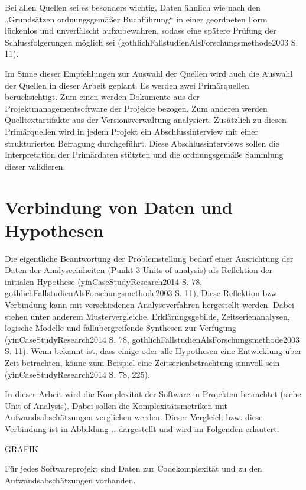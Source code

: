 Bei allen Quellen sei es besonders wichtig, Daten ähnlich wie nach den
„Grundsätzen ordnungsgemäßer Buchführung`` in einer geordneten Form
lückenlos und unverfälscht aufzubewahren, sodass eine spätere Prüfung
der Schlussfolgerungen möglich sei
(gothlichFallstudienAlsForschungsmethode2003 S. 11).

Im Sinne dieser Empfehlungen zur Auswahl der Quellen wird auch die
Auswahl der Quellen in dieser Arbeit geplant. Es werden zwei
Primärquellen berücksichtigt. Zum einen werden Dokumente aus der
Projektmanagementsoftware der Projekte bezogen. Zum anderen werden
Quelltextartifakte aus der Versionsverwaltung analysiert. Zusätzlich zu
diesen Primärquellen wird in jedem Projekt ein Abschlussinterview mit
einer strukturierten Befragung durchgeführt. Diese Abschlussinterviews
sollen die Interpretation der Primärdaten stützten und die
ordnungsgemäße Sammlung dieser validieren.

\section{Verbindung von Daten und Hypothesen}\label{verbindung-von-daten-und-hypothesen}

Die eigentliche Beantwortung der Problemstellung bedarf einer
Ausrichtung der Daten der Analyseeinheiten (Punkt 3 Units of analysis)
als Reflektion der initialen Hypothese (yinCaseStudyResearch2014 S. 78,
gothlichFallstudienAlsForschungsmethode2003 S. 11). Diese Reflektion
bzw. Verbindung kann mit verschiedenen Analyseverfahren hergestellt
werden. Dabei stehen unter anderem Mustervergleiche, Erklärungsgebilde,
Zeitserienanalysen, logische Modelle und fallübergreifende Synthesen zur
Verfügung (yinCaseStudyResearch2014 S. 78,
gothlichFallstudienAlsForschungsmethode2003 S. 11). Wenn bekannt ist,
dass einige oder alle Hypothesen eine Entwicklung über Zeit betrachten,
könne zum Beispiel eine Zeitserienbetrachtung sinnvoll sein
(yinCaseStudyResearch2014 S. 78, 225).

In dieser Arbeit wird die Komplexität der Software in Projekten
betrachtet (siehe Unit of Analysis). Dabei sollen die
Komplexitätsmetriken mit Aufwandsabschätzungen verglichen werden. Dieser
Vergleich bzw. diese Verbindung ist in Abbildung .. dargestellt und wird
im Folgenden erläutert.

GRAFIK

Für jedes Softwareprojekt sind Daten zur Codekomplexität und zu den
Aufwandsabschätzungen vorhanden.

